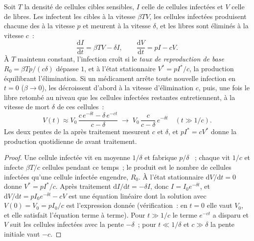 \begin{theorem}\label{thm:b3:virology:dynamics}
Soit $T$ la densité de cellules cibles sensibles, $I$ celle de cellules
infectées et $V$ celle de  libres. Les  infectent les
cibles à la vitesse $\beta TV$, les cellules infectées produisent
chacune des  à la vitesse $p$ et meurent à la vitesse $\delta$,
et les  libres sont éliminés à la vitesse $c$~:
\[
\frac{\mathrm{d}I}{\mathrm{d}t} = \beta TV - \delta I, \qquad
\frac{\mathrm{d}V}{\mathrm{d}t} = pI - cV .
\]
À $T$ maintenu constant, l'infection croît si le \emph{taux de
reproduction de base} $R_{0} = \beta Tp/(c\delta)$ dépasse $1$, et à
l'état stationnaire $V^{*} = p I^{*}/c$, la production équilibrant
l'élimination. Si un médicament arrête toute nouvelle infection en
$t = 0$ ($\beta \to 0$), les  décroissent d'abord à la vitesse
d'élimination $c$, puis, une fois le  libre retombé au niveau que
les cellules infectées restantes entretiennent, à la vitesse de mort
$\delta$ de ces cellules~:
\[
V(t) \approx V_{0}\,\frac{c\,e^{-\delta t} - \delta\,e^{-ct}}{c - \delta}
\;\longrightarrow\; V_{0}\,\frac{c}{c-\delta}\,e^{-\delta t}
\quad (t \gg 1/c).
\]
Les deux pentes de la  après traitement mesurent $c$ et
$\delta$, et $pI^{*} = cV^{*}$ donne la production quotidienne de
 avant traitement.
\end{theorem}
\begin{proof}
Une cellule infectée vit en moyenne $1/\delta$ et fabrique $p/\delta$
~; chaque  vit $1/c$ et infecte $\beta T/c$ cellules
pendant ce temps~; le produit est le nombre de cellules infectées
qu'une cellule infectée engendre, $R_{0}$. À l'état stationnaire
$\mathrm{d}V/\mathrm{d}t = 0$ donne $V^{*} = pI^{*}/c$. Après
traitement $\mathrm{d}I/\mathrm{d}t =
-\delta I$, donc $I = I_{0}e^{-\delta t}$, et $\mathrm{d}V/\mathrm{d}t =
pI_{0}e^{-\delta t} - cV$ est une équation linéaire dont la solution
avec $V(0) = V_{0} = pI_{0}/c$ est l'expression donnée (vérification~:
en $t = 0$ elle vaut $V_{0}$, et elle satisfait l'équation terme à
terme). Pour $t
\gg 1/c$ le terme $e^{-ct}$ a disparu et $V$ suit les cellules infectées
avec la pente $-\delta$~; pour $t \ll 1/\delta$ et $c \gg \delta$ la
pente initiale vaut $-c$.
\end{proof}

